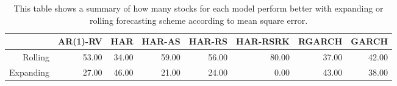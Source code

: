 \begin{table}[ht]
\centering
\begin{tabular}{rrrrrrrr}
  \hline
 & AR(1)-RV & HAR & HAR-AS & HAR-RS & HAR-RSRK & RGARCH & GARCH \\ 
  \hline
Rolling & 53.00 & 34.00 & 59.00 & 56.00 & 80.00 & 37.00 & 42.00 \\ 
  Expanding & 27.00 & 46.00 & 21.00 & 24.00 & 0.00 & 43.00 & 38.00 \\ 
   \hline
\end{tabular}
\caption[Better scheme MSE summary]{This table shows a summary of how many stocks for each model perform better with expanding or rolling forecasting scheme according to mean square error. } 
\label{Table:Better_MSE_summary}
\end{table}
